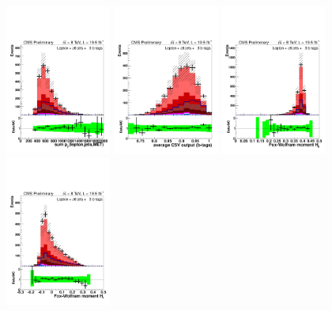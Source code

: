\begin{figure}[hbtp]
 \begin{center}
   \includegraphics[width=0.31\textwidth]{Figures/Analysis_2_Diagrams/LJ_plots_lep/6j3t/lep_all_sum_pt_with_met_6j3t_cumulative_wRatio_noLegend_lin.pdf}
   \includegraphics[width=0.31\textwidth]{Figures/Analysis_2_Diagrams/LJ_plots_lep/6j3t/lep_avg_btag_disc_btags_6j3t_cumulative_wRatio_noLegend_lin.pdf}
   \includegraphics[width=0.31\textwidth]{Figures/Analysis_2_Diagrams/LJ_plots_lep/6j3t/lep_h0_6j3t_cumulative_wRatio_noLegend_lin.pdf}
   \includegraphics[width=0.31\textwidth]{Figures/Analysis_2_Diagrams/LJ_plots_lep/6j3t/lep_h1_6j3t_cumulative_wRatio_noLegend_lin.pdf}

\end{center}
\end{figure}
